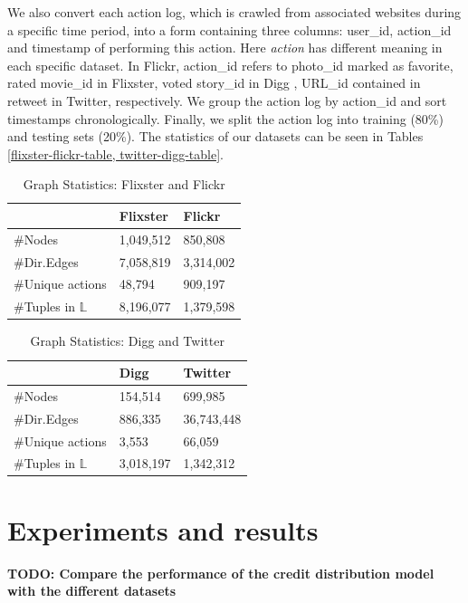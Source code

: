 \documentclass{acm_proc_article-sp}
\begin{document}
We also convert each action log, which is crawled from associated websites during a specific time period, into a form containing three columns: user\_id, action\_id and timestamp of performing this action. Here \textit{action} has different meaning in each specific dataset. In Flickr, action\_id refers to photo\_id marked as favorite, rated movie\_id in Flixster, voted story\_id in Digg , URL\_id contained in retweet in Twitter, respectively. We group the action log by action\_id and sort timestamps chronologically. Finally, we split the action log into training (80\%) and testing sets (20\%). The statistics of our datasets can be seen in Tables \ref{flixster-flickr-table, twitter-digg-table}.


\begin{table}[]
	\centering
	\caption{Graph Statistics: Flixster and Flickr}
	\label{flixster-flickr-table}
	\begin{tabular}{|l|l|l|}
		\hline
		& Flixster  & Flickr \\ \hline
		\#Nodes         & 1,049,512 & 850,808   \\ \hline
		\#Dir.Edges     & 7,058,819 & 3,314,002   \\ \hline
		\#Unique actions     & 48,794    & 909,197    \\ \hline
		\#Tuples in $\mathbb{L}$ & 8,196,077 & 1,379,598  \\ \hline
	\end{tabular}
\end{table}


\begin{table}[]
	\centering
	\caption{Graph Statistics: Digg and Twitter}
	\label{twitter-digg-table}
	\begin{tabular}{|l|l|l|}
		\hline
		&  Digg      & Twitter    \\ \hline
		\#Nodes        & 154,514   & 699,985    \\ \hline
		\#Dir.Edges    & 886,335   & 36,743,448 \\ \hline
		\#Unique actions    & 3,553     & 66,059     \\ \hline
		\#Tuples in $\mathbb{L}$ & 3,018,197 & 1,342,312  \\ \hline
	\end{tabular}
\end{table}


\section{Experiments and results}
\textbf{TODO: Compare the performance of the credit distribution model with the different datasets}
\end{document}
